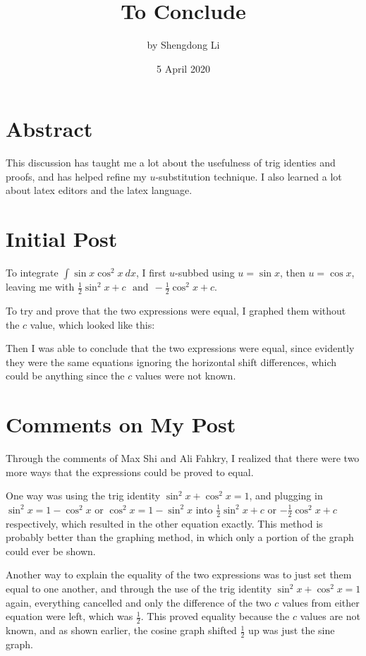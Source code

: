 \documentclass[letterpaper, 12pt]{article}
\begin{document}
\title{To Conclude}
\author{by Shengdong Li}
\date{5 April 2020}
\maketitle

\section{Abstract}
This discussion has taught me a lot about the usefulness of trig identies and proofs, and has helped refine my $u$-substitution technique. I also learned a lot about latex editors and the latex language.
\section{Initial Post}
To integrate $\int\sin x\cos^2 x\:dx$, I first $u$-subbed using $u = \sin x$, then $u = \cos x$, leaving me with
$\frac{1}{2}\sin^2x+c\:\:\:\text{and}\:\:-\frac{1}{2}\cos^2x+c$. \par
To try and prove that the two expressions were equal, I graphed them without the $c$ value, which looked like this: \par
\begin{center}
\end{center}
Then I was able to conclude that the two expressions were equal, since evidently they were the same equations ignoring the horizontal shift differences, which could be anything since the $c$ values were not known.
\section{Comments on My Post}
Through the comments of Max Shi and Ali Fahkry, I realized that there were two more ways that the expressions could be proved to equal.\par
One way was using the trig identity $\sin^2x+\cos^2x=1$, and plugging in  $\sin^2x=1-\cos^2x$ or $\cos^2x=1-\sin^2x$ into $\frac{1}{2}\sin^2x+c$ or
$-\frac{1}{2}\cos^2x+c$ respectively, which resulted in the other equation exactly. This method is probably better than the graphing method, in which only a portion of the graph could ever be shown. \par
Another way to explain the equality of the two expressions was to just set them equal to one another, and through the use of the trig identity $\sin^2x+\cos^2x=1$ again, everything cancelled and only the difference of the two $c$ values from either equation were left, which was $\frac{1}{2}$. This proved equality because the $c$ values are not known, and as shown earlier, the cosine graph shifted $\frac{1}{2}$ up was just the sine graph.
\end{document}

